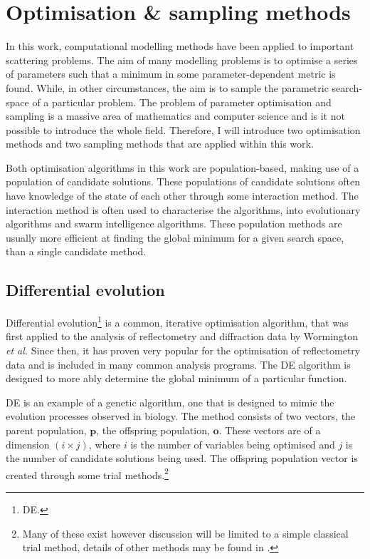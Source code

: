 \section{Optimisation \& sampling methods}
\label{sec:optimisation}
In this work, computational modelling methods have been applied to important scattering problems.
The aim of many modelling problems is to optimise a series of parameters such that a minimum in some parameter-dependent metric is found.
While, in other circumstances, the aim is to sample the parametric search-space of a particular problem.
The problem of parameter optimisation and sampling is a massive area of mathematics and computer science and is it not possible to introduce the whole field.
Therefore, I will introduce two optimisation methods and two sampling methods that are applied within this work.

Both optimisation algorithms in this work are population-based, making use of a population of candidate solutions.
These populations of candidate solutions often have knowledge of the state of each other through some interaction method.
The interaction method is often used to characterise the algorithms, into evolutionary algorithms and swarm intelligence algorithms.\autocite{wu_ensemble_2019}
These population methods are usually more efficient at finding the global minimum for a given search space, than a single candidate method.

\subsection{Differential evolution}
\label{sec:de}
Differential evolution\footnote{DE.} is a common, iterative optimisation algorithm, that was first applied to the analysis of reflectometry and diffraction data by Wormington \emph{et al.}\autocite{wormington_characterization_1999}
Since then, it has proven very popular for the optimisation of reflectometry data and is included in many common analysis programs.\autocite{bjorck_fitting_2011,bjorck_genx_2007,nelson_co-refinement_2006,nelson_refnx_2019,ott_simulreflec_nodate,kienzle_ncnr_nodate}
The DE algorithm is designed to more ably determine the global minimum of a particular function.\autocite{storn_differential_1997}

DE is an example of a genetic algorithm, one that is designed to mimic the evolution processes observed in biology.\autocite{holland_adaptation_1992}
The method consists of two vectors, the parent population, $\mathbf{p}$, the offspring population, $\mathbf{o}$.
These vectors are of a dimension $(i\times j)$, where $i$ is the number of variables being optimised and $j$ is the number of candidate solutions being used.
The offspring population vector is created through some trial methods.\footnote{Many of these exist however discussion will be limited to a simple classical trial method, details of other methods may be found in \cite{bjorck_fitting_2011}.}

